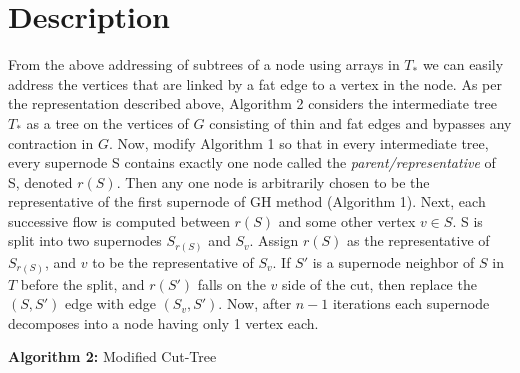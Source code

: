     \section{Description}
    From the above addressing of subtrees of a node using arrays in $T_*$ we can easily address the vertices that are linked by a fat edge to a vertex in the node. As per the representation described above, Algorithm 2 considers the intermediate tree $T_*$ as a tree on the vertices of $G$ consisting of thin and fat edges and bypasses any contraction in $G$. Now, modify Algorithm 1 so that in every intermediate tree, every supernode S contains exactly one node called the \textit{parent/representative} of S, denoted $r(S)$. Then any one node is arbitrarily chosen to be the representative of the first supernode of GH method (Algorithm 1). Next, each successive flow is computed between $r(S)$ and some other vertex $v\in S$. S is split into two supernodes $S_{r(S)}$ and $S_v$. Assign $r(S)$ as the representative of $S_{r(S)}$, and $v$ to be the representative of $S_v$. If $S'$ is a supernode neighbor of $S$ in $T$ before the split, and $r(S')$ falls on the $v$ side of the cut, then replace the $(S,S')$ edge with edge $(S_v,S')$. Now, after $n-1$ iterations each supernode decomposes into a node having only 1 vertex each.

    \vspace{2cm}
    \begin{algorithm}[H]
        \hrulefill
        
        \textbf{Algorithm 2:} Modified Cut-Tree
        
        \hrulefill
        \vspace{2mm}

    \DontPrintSemicolon
    
    
    \vspace{2mm}
    \hrulefill
    
    \end{algorithm}


    
    